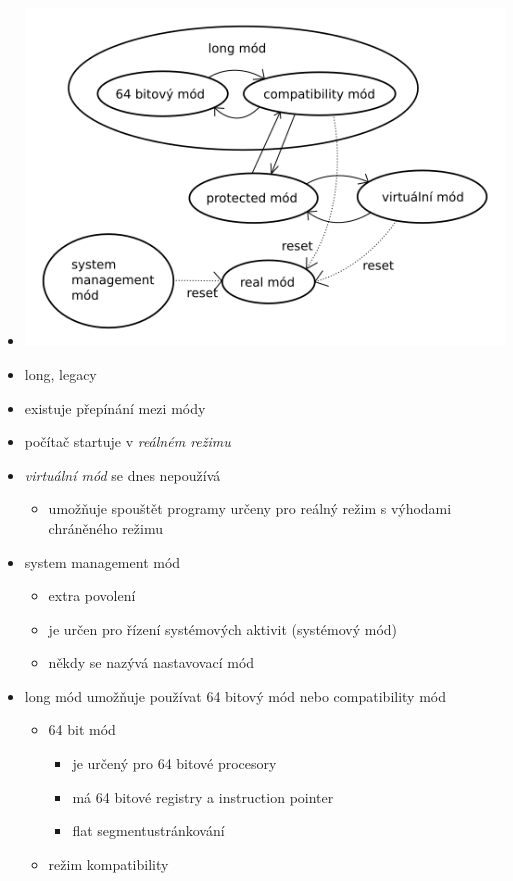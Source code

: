 \documentclass[a4paper,12pt]{article}
\providecommand{\tightlist}{%
\setlength{\itemsep}{0pt}\setlength{\parskip}{0pt}}
\begin{document}
\begin{itemize}
\tightlist
\item[] \includegraphics[width=13.704cm]{ref/mody.png}
\item long, legacy
\item existuje přepínání mezi módy
\item počítač startuje v \emph{reálném režimu}
\item \emph{virtuální mód} se dnes nepoužívá

  \begin{itemize}
  \tightlist
  \item umožňuje spouštět programy určeny pro reálný režim s výhodami
    chráněného režimu
  \end{itemize}
\item system management mód

  \begin{itemize}
  \tightlist
  \item extra povolení
  \item je určen pro řízení systémových aktivit (systémový mód)
  \item někdy se nazývá nastavovací mód
  \end{itemize}
\item long mód umožňuje používat 64 bitový mód nebo compatibility mód

  \begin{itemize}
    \tightlist
  \item 64 bit mód

    \begin{itemize}
    \tightlist
    \item je určený pro 64 bitové procesory
    \item má 64 bitové registry a instruction pointer
    \item flat segmentustránkování
    \end{itemize}
  \item režim kompatibility


\end{itemize}
\end{itemize}
\end{document}
